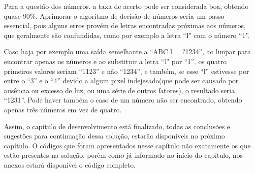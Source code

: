 Para a questão dos números, a taxa de acerto pode ser considerada boa, obtendo quase 90\%. Aprimorar o algoritmo de decisão de números seria um passo essencial, pois alguns erros provém de letras encontradas próximas aos números, que geralmente são confundidas, como por exemplo a letra ``l'' com o número ``1''. 

Caso haja por exemplo uma saída semelhante a ``ABC l \_ ?1234'', ao limpar para encontrar apenas os números e ao substituir a letra ``l'' por ``1'', os quatro primeiros valores seriam ``1123'' e não ``1234'', e também, se esse ``l'' estivesse por entre o ``3'' e o ``4'' devido a algum pixel indejesado(que pode ser causado por ausência ou excesso de luz, ou uma série de outros fatores), o resultado seria ``1231''. Pode haver também o caso de um número não ser encontrado, obtendo apenas três números em vez de quatro.

Assim, o capítulo de desenvolvimento está finalizado, todas as conclusões e sugestões para continuação dessa solução, estarão disponíveis no próximo capítulo. O códigos que foram apresentados nesse capítulo não exatamente os que estão presentes na solução, porém como já informado no início do capítulo, nos anexos estará disponível o código completo.   
